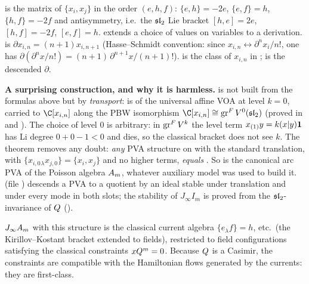 \begin{dictionary}
 is the matrix of $\{x_i,x_j\}$ in the order $(e,h,f)$:
$\{e,h\}=-2e$, $\{e,f\}=h$, $\{h,f\}=-2f$ and antisymmetry, i.e.\ the $\mathfrak{sl}_2$ Lie bracket
$[h,e]=2e$, $[h,f]=-2f$, $[e,f]=h$.  extends a choice of values on variables to a
derivation.  is $\partial x_{i,n}=(n+1)x_{i,n+1}$ (Hasse--Schmidt convention: since
$x_{i,n}\leftrightarrow\partial^nx_i/n!$, one has $\partial(\partial^nx/n!)=(n+1)\,\partial^{n+1}x/(n+1)!$).
 is the class of $x_{i,n}$ in ;
 is the descended $\partial$.

\textbf{A surprising construction, and why it is harmless.}  is not built from the
formulas above but by \emph{transport}:  is  of the
universal affine VOA at level $k=0$, carried to $\C[x_{i,n}]$ along the PBW isomorphism
$\C[x_{i,n}]\cong\ltwentygr V^0(\ltwentysl)$ (proved in 
and ). The choice of level $0$ is arbitrary: in $\operatorname{gr}^F V^k$ the
level term $x_{(1)}y=k(x|y)\mathbf{1}$ has Li degree $0+0-1<0$ and dies, so the classical bracket does not
see $k$. The theorem  removes any doubt: \emph{any} PVA structure on
 with the standard translation, with $\{x_{i,0}{}_\lambda x_{j,0}\}=\{x_i,x_j\}$
and no higher terms, \emph{equals} . So  is the canonical arc PVA of the Poisson
algebra $A_m$, whatever auxiliary model was used to build it. 
(file ) descends a PVA to a quotient by an
ideal stable under translation and under every mode in both slots; the stability of $J_\infty I_m$ is proved
from the $\mathfrak{sl}_2$-invariance of $Q$ ().
\end{dictionary}

\begin{physics}
$J_\infty A_m$ with this structure is the classical current algebra $\{e_\lambda f\}=h$, etc.\ (the
Kirillov--Kostant bracket extended to fields), restricted to field configurations satisfying the classical
constraints $xQ^m=0$. Because $Q$ is a Casimir, the constraints are compatible with the
Hamiltonian flows generated by the currents: they are first-class.
\end{physics}

